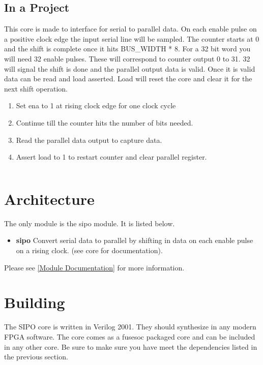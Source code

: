 

\subsection{In a Project}
\par
This core is made to interface for serial to parallel data. On each enable pulse on a positive clock edge the input serial
line will be sampled. The counter starts at 0 and the shift is complete once it hits BUS\_WIDTH * 8. For a 32 bit word you will
need 32 enable pulses. These will correspond to counter output 0 to 31. 32 will signal the shift is done and the parallel output
data is valid. Once it is valid data can be read and load asserted. Load will reset the core and clear it for the next shift operation.
\begin{enumerate}
  \item Set ena to 1 at rising clock edge for one clock cycle
  \item Continue till the counter hits the number of bits needed.
  \item Read the parallel data output to capture data.
  \item Assert load to 1 to restart counter and clear parallel register.
\end{enumerate}

\begin{lstlisting}[language=Verilog]
\end{lstlisting}

\section{Architecture}
\par
The only module is the sipo module. It is listed below.

\begin{itemize}
  \item \textbf{sipo} Convert serial data to parallel by shifting in data on each enable pulse on a rising clock. (see core for documentation).
\end{itemize}

Please see \ref{Module Documentation} for more information.

\section{Building}

\par
The SIPO core is written in Verilog 2001. They should synthesize in any modern FPGA software. The core comes as a fusesoc packaged core and can be
included in any other core. Be sure to make sure you have meet the dependencies listed in the previous section.

